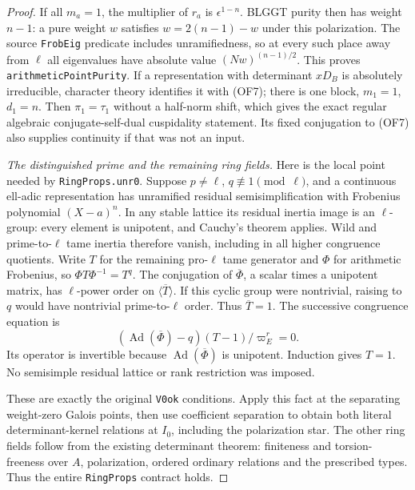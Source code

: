 \begin{proof}
If all $m_a=1$, the multiplier of $r_a$ is $\epsilon^{1-n}$.
BLGGT purity then has weight $n-1$: a pure weight $w$ satisfies
$w=2(n-1)-w$ under this polarization.  The source \texttt{FrobEig}
predicate includes unramifiedness, so at every such place away from
$\ell$ all eigenvalues have absolute value $(Nw)^{(n-1)/2}$.
This proves \texttt{arithmeticPointPurity}.  If a representation with
determinant $xD_B$ is absolutely irreducible, character theory identifies
it with (OF7); there is one block, $m_1=1$, $d_1=n$.
Then $\pi_1=\tau_1$ without a half-norm shift, which gives the exact
regular algebraic conjugate-self-dual cuspidality statement.  Its
fixed conjugation to (OF7) also supplies continuity if that was not
an input.

\emph{The distinguished prime and the remaining ring fields.}
Here is the local point needed by \texttt{RingProps.unr0}.
Suppose $p\ne\ell$, $q\not\equiv1\pmod\ell$, and a continuous
ell-adic representation has unramified residual semisimplification
with Frobenius polynomial $(X-a)^n$.  In any stable lattice its
residual inertia image is an $\ell$-group: every element is unipotent,
and Cauchy's theorem applies.  Wild and prime-to-$\ell$ tame inertia
therefore vanish, including in all higher congruence quotients.
Write $T$ for the remaining pro-$\ell$ tame generator and $\Phi$
for arithmetic Frobenius, so $\Phi T\Phi^{-1}=T^q$.
The conjugation of $\overline\Phi$, a scalar times a unipotent matrix,
has $\ell$-power order on $\langle\overline T\rangle$.
If this cyclic group were nontrivial, raising to $q$ would have
nontrivial prime-to-$\ell$ order.  Thus $\overline T=1$.
The successive congruence equation is
\[
  (\operatorname{Ad}(\overline\Phi)-q)
                (T-1)/\varpi_E^r=0.                              \tag{OF8}
\]
Its operator is invertible because $\operatorname{Ad}(\overline\Phi)$
is unipotent.  Induction gives $T=1$.  No semisimple residual lattice
or rank restriction was imposed.

These are exactly the original \texttt{V0ok} conditions.  Apply this
fact at the separating weight-zero Galois points, then use coefficient
separation to obtain both literal determinant-kernel relations at
$I_0$, including the polarization star.  The other ring fields follow
from the existing determinant theorem: finiteness and torsion-freeness
over $A$, polarization, ordered ordinary relations and the prescribed
types.  Thus the entire \texttt{RingProps} contract holds.


\end{proof}
